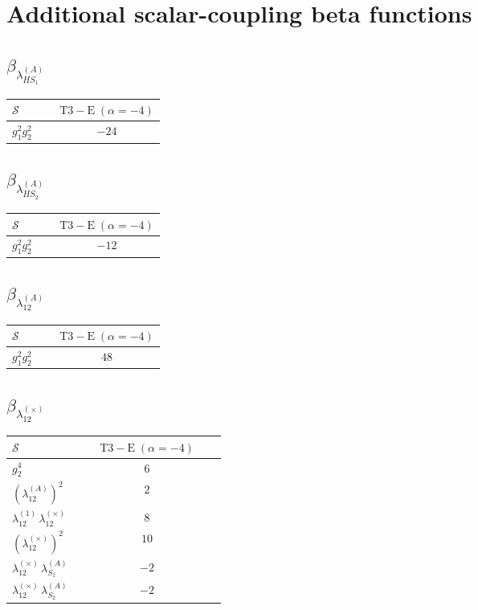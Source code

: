 \documentclass[9pt]{article}
\begin{document}
\section*{Additional scalar-coupling beta functions}
\subsection*{$ \beta_{\lambda_{HS_1}^{(A)}} $}
\begin{longtable}{@{}p{0.31\linewidth}c@{}}
\toprule
$\mathcal{S}$ & $ \mathrm{T3-E}\;(\alpha=-4) $ \\
\midrule
$ g_1^2g_2^2 $ & $ -24 $ \\
\bottomrule
\end{longtable}
\subsection*{$ \beta_{\lambda_{HS_2}^{(A)}} $}
\begin{longtable}{@{}p{0.31\linewidth}c@{}}
\toprule
$\mathcal{S}$ & $ \mathrm{T3-E}\;(\alpha=-4) $ \\
\midrule
$ g_1^2g_2^2 $ & $ -12 $ \\
\bottomrule
\end{longtable}
\subsection*{$ \beta_{\lambda_{12}^{(A)}} $}
\begin{longtable}{@{}p{0.31\linewidth}c@{}}
\toprule
$\mathcal{S}$ & $ \mathrm{T3-E}\;(\alpha=-4) $ \\
\midrule
$ g_1^2g_2^2 $ & $ 48 $ \\
\bottomrule
\end{longtable}
\subsection*{$ \beta_{\lambda_{12}^{(\times)}} $}
\begin{longtable}{@{}p{0.31\linewidth}c@{}}
\toprule
$\mathcal{S}$ & $ \mathrm{T3-E}\;(\alpha=-4) $ \\
\midrule
$ g_2^4 $ & $ 6 $ \\
$ \left(\lambda_{12}^{(A)}\right)^2 $ & $ 2 $ \\
$ \lambda_{12}^{(1)}\,\lambda_{12}^{(\times)} $ & $ 8 $ \\
$ \left(\lambda_{12}^{(\times)}\right)^2 $ & $ 10 $ \\
$ \lambda_{12}^{(\times)}\,\lambda_{S_1}^{(A)} $ & $ -2 $ \\
$ \lambda_{12}^{(\times)}\,\lambda_{S_2}^{(A)} $ & $ -2 $ \\
\bottomrule
\end{longtable}
\end{document}
